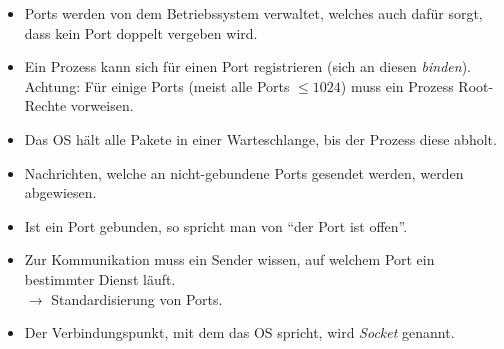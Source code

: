         \begin{itemize}
        	\item Ports werden von dem Betriebssystem verwaltet, welches auch dafür sorgt, dass kein Port doppelt vergeben wird.
        	\item Ein Prozess kann sich für einen Port registrieren (sich an diesen \textit{binden}). \\ Achtung: Für einige Ports (meist alle Ports \( \leq 1024 \)) muss ein Prozess Root-Rechte vorweisen.
        	\item Das OS hält alle Pakete in einer Warteschlange, bis der Prozess diese abholt.
        	\item Nachrichten, welche an nicht-gebundene Ports gesendet werden, werden abgewiesen.
        	\item Ist ein Port gebunden, so spricht man von \enquote{der Port ist offen}.
        	\item Zur Kommunikation muss ein Sender wissen, auf welchem Port ein bestimmter Dienst läuft. \\ \( \rightarrow \) Standardisierung von Ports.
        	\item Der Verbindungspunkt, mit dem das OS spricht, wird \textit{Socket} genannt.
        \end{itemize}

